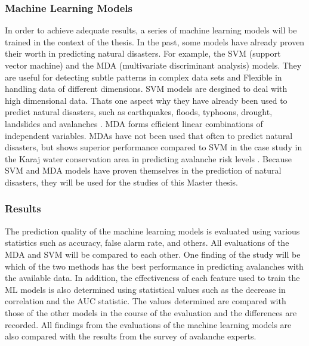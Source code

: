 \documentclass[12pt,a4paper]{article}
\begin{document}
\subsubsection{Machine Learning Models}
In order to achieve adequate results, a series of machine learning models will be trained in the context of the thesis. In the past, some models have already proven their worth in predicting natural disasters. For example, the SVM (support vector machine) and the MDA (multivariate discriminant analysis) models. They are useful for detecting subtle patterns in complex data sets and Flexible in handling data of different dimensions. SVM models are desgined to deal with high dimensional data. Thats one aspect why they have already been used to predict natural disasters, such as earthquakes, floods, typhoons, drought, landslides and avalanches \autocite{Bahram:2019} \autocite[]{Tiwari:2021} \autocite{Pozdnoukhov:2008}. MDA forms efficient linear combinations of independent variables. MDAs have not been used that often to predict natural disasters, but shows superior performance compared to SVM in the case study in the Karaj water conservation area in predicting avalanche risk levels \autocite[]{Tiwari:2021}. Because SVM and MDA models have proven themselves in the prediction of natural disasters, they will be used for the studies of this Master thesis.





\subsubsection{Results}
The prediction quality of the machine learning models is evaluated using various statistics such as accuracy, false alarm rate, and others. All evaluations of the MDA and SVM will be compared to each other. One finding of the study will be which of the two methods has the best performance in predicting avalanches with the available data.
In addition, the effectiveness of each feature used to train the ML models is also determined using statistical values such as the decrease in correlation and the AUC statistic. The values determined are compared with those of the other models in the course of the evaluation and the differences are recorded. 
All findings from the evaluations of the machine learning models are also compared with the results from the survey of avalanche experts.
\end{document}
